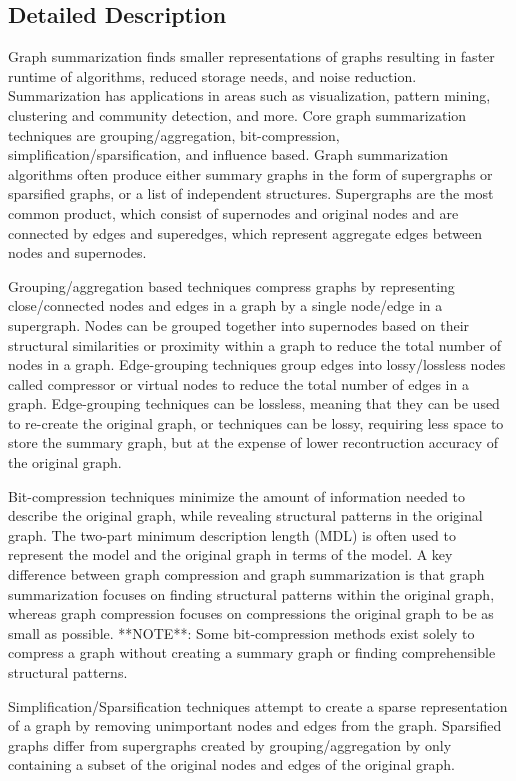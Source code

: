 \subsection{Detailed Description}
\begin{DoxyVerb}Graph summarization finds smaller representations of graphs resulting in faster
runtime of algorithms, reduced storage needs, and noise reduction.
Summarization has applications in areas such as visualization, pattern mining,
clustering and community detection, and more.  Core graph summarization
techniques are grouping/aggregation, bit-compression,
simplification/sparsification, and influence based. Graph summarization
algorithms often produce either summary graphs in the form of supergraphs or
sparsified graphs, or a list of independent structures. Supergraphs are the
most common product, which consist of supernodes and original nodes and are
connected by edges and superedges, which represent aggregate edges between
nodes and supernodes.

Grouping/aggregation based techniques compress graphs by representing
close/connected nodes and edges in a graph by a single node/edge in a
supergraph. Nodes can be grouped together into supernodes based on their
structural similarities or proximity within a graph to reduce the total number
of nodes in a graph. Edge-grouping techniques group edges into lossy/lossless
nodes called compressor or virtual nodes to reduce the total number of edges in
a graph. Edge-grouping techniques can be lossless, meaning that they can be
used to re-create the original graph, or techniques can be lossy, requiring
less space to store the summary graph, but at the expense of lower
recontruction accuracy of the original graph.

Bit-compression techniques minimize the amount of information needed to
describe the original graph, while revealing structural patterns in the
original graph.  The two-part minimum description length (MDL) is often used to
represent the model and the original graph in terms of the model.  A key
difference between graph compression and graph summarization is that graph
summarization focuses on finding structural patterns within the original graph,
whereas graph compression focuses on compressions the original graph to be as
small as possible.  **NOTE**: Some bit-compression methods exist solely to
compress a graph without creating a summary graph or finding comprehensible
structural patterns.

Simplification/Sparsification techniques attempt to create a sparse
representation of a graph by removing unimportant nodes and edges from the
graph.  Sparsified graphs differ from supergraphs created by
grouping/aggregation by only containing a subset of the original nodes and
edges of the original graph.


\end{DoxyVerb}
